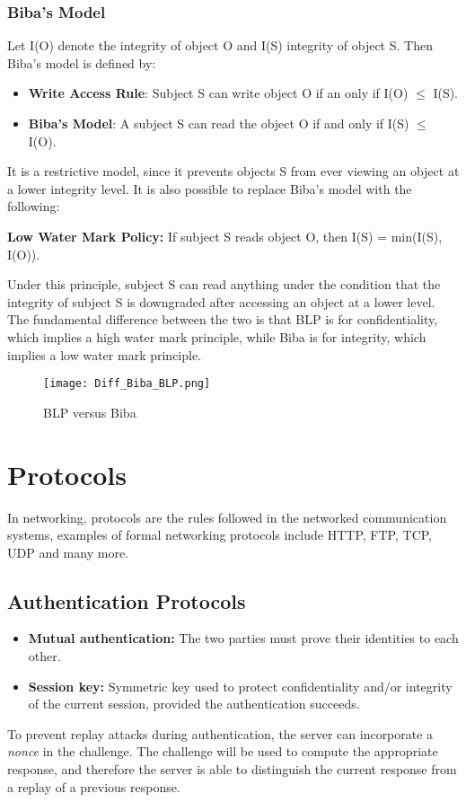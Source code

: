 \documentclass{article}
\begin{document}
\subsubsection{Biba's Model}
Let I(O) denote the integrity of object O and I(S) integrity of object S. Then Biba's model is defined by:
\begin{itemize}
    \item \textbf{Write Access Rule}: Subject S can write object O if an only if I(O) $\leq$ I(S).
    \item \textbf{Biba's Model}: A subject S can read the object O if and only if I(S) $\leq$ I(O).
\end{itemize}
It is a restrictive model, since it prevents objects S from ever viewing an object at a lower integrity level. It is also possible to replace Biba's model with the following:
\begin{center}
    \textbf{Low Water Mark Policy:} If subject S reads object O, then I(S) = min(I(S), I(O)).
\end{center}
Under this principle, subject S can read anything under the condition that the integrity of subject S is downgraded after accessing an object at a lower level.\\
The fundamental difference between the two is that BLP is for confidentiality, which implies a high water mark principle, while Biba is for integrity, which implies a low water mark principle.
\begin{figure}[H]
    \centering
    \texttt{[image: Diff\_Biba\_BLP.png]}
    \caption{BLP versus Biba}
\end{figure}

\newpage
\section{Protocols}
In networking, protocols are the rules followed in the networked communication systems, examples of formal networking protocols include HTTP, FTP, TCP, UDP and many more.

\subsection{Authentication Protocols}
\begin{itemize}
    \item \textbf{Mutual authentication:} The two parties must prove their identities to each other.
    \item \textbf{Session key:} Symmetric key used to protect confidentiality and/or integrity of the current session, provided the authentication succeeds.
\end{itemize}
To prevent replay attacks during authentication, the server can incorporate a \textit{nonce} in the challenge. The challenge will be used to compute the appropriate response, and therefore the server is able to distinguish the current response from a replay of a previous response.
\end{document}
